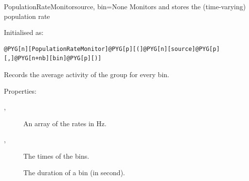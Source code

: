 \documentclass[letterpaper,10pt,english]{manual}
\begin{document}
\hypertarget{brian.PopulationRateMonitor}{}\begin{classdesc}{PopulationRateMonitor}{source, bin=None}
Monitors and stores the (time-varying) population rate

Initialised as:

\begin{Verbatim}[commandchars=@\[\]]
@PYG[n][PopulationRateMonitor]@PYG[p][(]@PYG[n][source]@PYG[p][,]@PYG[n+nb][bin]@PYG[p][)]
\end{Verbatim}

Records the average activity of the group for every bin.

Properties:
\begin{description}
\item[, ] \leavevmode
An array of the rates in Hz.

\item[, ] \leavevmode
The times of the bins.

\item[] \leavevmode
The duration of a bin (in second).

\end{description}
\end{classdesc}
\end{document}
